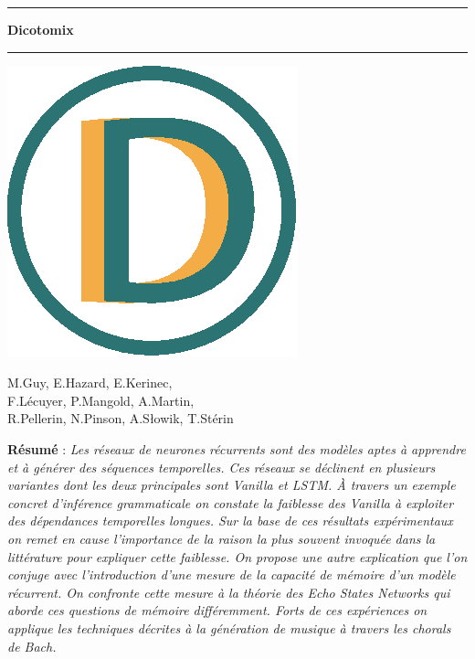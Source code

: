 \documentclass[11pt,a4paper]{article}
\theoremstyle{plain}
\theoremstyle{definition}
\begin{document}
\begin{center}


\vspace{1.5cm}

\rule[11pt]{5cm}{0.5pt}

\textbf{\huge Dicotomix}

\rule{5cm}{0.5pt}
\vspace{0.5cm}

\includegraphics[scale=0.7]{icon.eps}

\vspace{0.5cm}

M.Guy, E.Hazard, E.Kerinec,\\ F.Lécuyer, P.Mangold, A.Martin,\\ R.Pellerin, N.Pinson, A.Słowik, T.Stérin

\vspace{1.5cm}

\parbox{15cm}{\small
\textbf{Résumé} : \it Les réseaux de neurones récurrents sont des modèles aptes à apprendre et à générer des séquences temporelles. Ces réseaux se déclinent en plusieurs variantes dont les deux principales sont Vanilla et LSTM. À travers un exemple concret d'inférence grammaticale on constate la faiblesse des Vanilla à exploiter des dépendances temporelles longues. Sur la base de ces résultats expérimentaux on remet en cause l'importance de la raison la plus souvent invoquée dans la littérature pour expliquer cette faiblesse. On propose une autre explication que l'on conjuge avec l'introduction d'une mesure de la capacité de mémoire d'un modèle récurrent. On confronte cette mesure à la théorie des Echo States Networks qui aborde ces questions de mémoire différemment. Forts de ces expériences on applique les techniques décrites à la génération de musique à travers les chorals de Bach.

}
\end{center}
\end{document}
